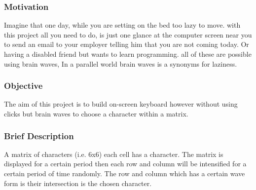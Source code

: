 \subsubsection{Motivation}
Imagine that one day, while you are setting on the bed too lazy to move. with this project all you need to do, is just one glance at the computer screen near you to send an email to your employer telling him that you are not coming today. Or having a disabled friend but wants to learn programming. all of these are possible using brain waves, In a parallel world brain waves is a synonyms for laziness.
\subsubsection{Objective}
The aim of this project is to build on-screen keyboard however without using clicks but brain waves to choose a character within a matrix.
\subsubsection{Brief Description}
A matrix of characters (i.e. 6x6) each cell has a character. The matrix is displayed for a certain period then each row and column will be intensified for a certain period of time randomly. The row and column which has a certain wave form is their intersection is the chosen character.